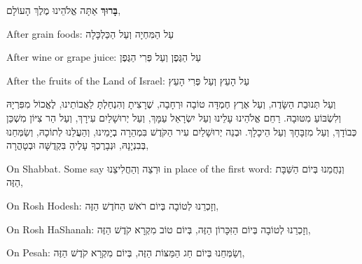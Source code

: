 
\label{meein-shalosh}

\textbf{בָּרוּךְ} אַתָּה \Shem{} אֱלֹהֵינוּ מֶלֶךְ הָעוֹלָם,

\begin{seasonal}{After grain foods:}
עַל הַמִּחְיָה וְעַל הַכַּלְכָּלָה
\end{seasonal}

\begin{seasonal}{After wine or grape juice:}
עַל הַגֶּפֶן וְעַל פְּרִי הַגֶּפֶן
\end{seasonal}

\begin{seasonal}{After the fruits of the Land of Israel:}
עַל הָעֵץ וְעַל פְּרִי הָעֵץ
\end{seasonal}

וְעַל תְּנוּבַת הַשָּׂדֶה, וְעַל אֶרֶץ חֶמְדָּה טוֹבָה וּרְחָבָה, שֶׁרָצִיתָ וְהִנְחַלְתָּ
לַאֲבוֹתֵינוּ, לֶאֱכוֹל מִפִּרְיָהּ וְלִשְׂבּוֹעַ מִטּוּבָהּ. רַחֵם \Shem{} אֱלֹהֵינוּ עָלֵינוּ
וְעַל יִשְׂרָאֵל עַמָּךְ, וְעַל יְרוּשָׁלַיִם עִירָךְ, וְעַל הַר צִיּוֹן מִשְׁכַּן כְּבוֹדָךְ, וְעַל
מִזְבָּחָךְ וְעַל הֵיכָלָךְ. וּבְנֵה יְרוּשָׁלַיִם עִיר הַקֹּדֶשׁ בִּמְהֵרָה בְיָמֵינוּ, וְהַעֲלֵנוּ
לְתוֹכָהּ, וְשַׂמְּחֵנוּ בְּבִנְיָנָהּ, וּנְבָרֶכְךָ עָלֶיהָ בִּקְדֻשָּׁה וּבְטָהֳרָה,

\begin{seasonal}{On Shabbat. Some say \foreignlanguage{hebrew}{וּרְצֵה וְהַחֲלִיצֵנוּ} in place of the first word:}
וְנַחֲמֵנוּ בְּיוֹם הַשַּׁבָּת הַזֶּה,
\end{seasonal}

\begin{seasonal}{On Rosh Hodesh:}
וְזָכְרֵנוּ לְטוֹבָה בְּיוֹם רֹאשׁ הַחֹדֶשׁ הַזֶּה,
\end{seasonal}

\begin{seasonal}{On Rosh HaShanah:}
וְזָכְרֵנוּ לְטוֹבָה בְּיוֹם הַזִּכָּרוֹן הַזֶּה, בְּיוֹם טוֹב מִקְרָא קֹדֶשׁ הַזֶּה,
\end{seasonal}

\begin{seasonal}{On Pesah:}
וְשַׂמְּחֵנוּ בְּיוֹם חַג הַמַּצּוֹת הַזֶּה, בְּיוֹם מִקְרָא קֹדֶשׁ הַזֶּה,
\end{seasonal}

